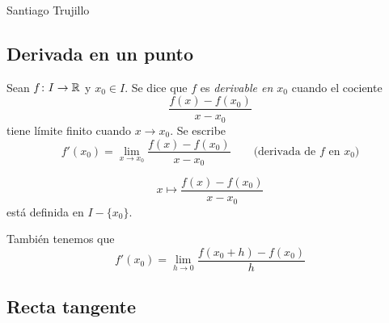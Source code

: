 \documentclass[11pt,a4paper]{article}
\begin{document}
\maketitle
\vspace{-1.6em}
\begin{center}
  {\normalsize Santiago Trujillo\par}
\end{center}
\vspace{0.5em}
\tableofcontents



\subsection{Derivada en un punto}

\begin{definicion}
  Sean $f\colon I\to\mathbb{R}$ y $x_0\in I$.
  Se dice que $f$ es \emph{derivable en $x_0$} cuando el cociente
  \[
    \frac{f(x)-f(x_0)}{x-x_0}
  \]
  tiene límite finito cuando $x\to x_0$. Se escribe
  \[
    f'(x_0)=\lim_{x\to x_0}\frac{f(x)-f(x_0)}{x-x_0}
    \qquad \text{(derivada de $f$ en $x_0$)}
  \]
\end{definicion}

\begin{observacion}
  \[
    x\longmapsto \frac{f(x)-f(x_0)}{x-x_0}
  \]
  está definida en $I-\{x_0\}$.
\end{observacion}

\begin{observacion}
  También tenemos que
  \[
    f'(x_0)=\lim_{h\to 0}\frac{f(x_0+h)-f(x_0)}{h}
  \]
\end{observacion}

\subsection{Recta tangente}
\end{document}
